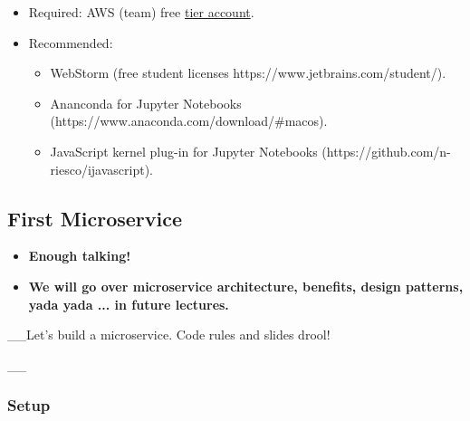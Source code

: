 \documentclass[11pt]{article}
\providecommand{\tightlist}{%
      \setlength{\itemsep}{0pt}\setlength{\parskip}{0pt}}
\begin{document}
\begin{itemize}
  \begin{itemize}
  \tightlist
  \item
    Required: AWS (team) free
    \href{https://aws.amazon.com/free/?sc_channel=PS\&sc_campaign=acquisition_US\&sc_publisher=google\&sc_medium=ACQ-P\%7CPS-GO\%7CBrand\%7CSU\%7CCore\%7CCore\%7CUS\%7CEN\%7CText\&sc_content=Brand_Free_e\&sc_detail=amazon\%20free\%20tier\&sc_category=core\&sc_segment=280392800801\&sc_matchtype=e\&sc_country=US\&sc_kwcid=AL!4422!3!280392800801!e!!g!!amazon\%20free\%20tier\&s_kwcid=AL!4422!3!280392800801!e!!g!!amazon\%20free\%20tier\&ef_id=WKzT_wAAAJllO8d4:20180811135240:s}{tier
    account}.
  \item
    Recommended:

    \begin{itemize}
    \tightlist
    \item
      WebStorm (free student licenses
      https://www.jetbrains.com/student/).
    \item
      Ananconda for Jupyter Notebooks
      (https://www.anaconda.com/download/\#macos).
    \item
      JavaScript kernel plug-in for Jupyter Notebooks
      (https://github.com/n-riesco/ijavascript).
    \end{itemize}
  \end{itemize}
\end{itemize}

    \subsection{First Microservice}\label{first-microservice}

\begin{itemize}
\item
  \textbf{Enough talking!}
\item
  \textbf{We will go over microservice architecture, benefits, design
  patterns, yada yada ... in future lectures.}
\end{itemize}

\_\_Let's build a microservice. Code rules and slides drool!

\_\_ 

    \subsubsection{Setup}\label{setup}
\end{document}
